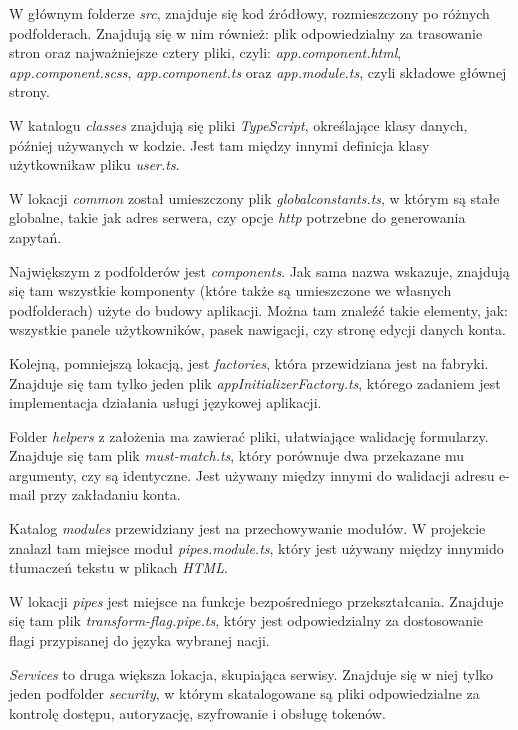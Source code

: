 \documentclass[twoside]{projektInzynierskiMS}
\numberwithin{figure}{section}
\begin{document}
W głównym folderze \textit{src}, znajduje się kod źródłowy, rozmieszczony po różnych podfolderach. Znajdują się w nim również: plik odpowiedzialny za trasowanie stron oraz najważniejsze cztery pliki, czyli:  \textit{app.component.html},  \textit{app.component.scss}, \linebreak \textit{app.component.ts} oraz \textit{app.module.ts}, czyli składowe głównej strony.

W katalogu \textit{classes} znajdują się pliki \textit{TypeScript}, określające klasy danych, później używanych w kodzie. Jest tam między innymi definicja klasy użytkownika\linebreak w pliku \textit{user.ts}.

W lokacji \textit{common} został umieszczony plik \textit{global\-constants.ts}, w którym są stałe globalne, takie jak adres serwera, czy opcje \textit{http} potrzebne do generowania zapytań.

Największym z podfolderów jest \textit{components}. Jak sama nazwa wskazuje, znajdują się tam wszystkie komponenty (które także są umieszczone we własnych podfolderach) użyte do budowy aplikacji. Można tam znaleźć takie elementy, jak: wszystkie panele użytkowników, pasek nawigacji, czy stronę edycji danych konta.

Kolejną, pomniejszą lokacją, jest \textit{factories}, która przewidziana jest na fabryki. Znajduje się tam tylko jeden plik \textit{appInitializerFactory.ts}, którego zadaniem jest implementacja działania usługi językowej aplikacji.

Folder \textit{helpers} z założenia ma zawierać pliki, ułatwiające walidację formularzy. Znajduje się tam plik \textit{must-match.ts}, który porównuje dwa przekazane mu argumenty, czy są identyczne. Jest używany między innymi do walidacji adresu e-mail przy zakładaniu konta.

Katalog \textit{modules} przewidziany jest na przechowywanie modułów. W projekcie znalazł tam miejsce moduł \textit{pipes.module.ts}, który jest używany między innymi\linebreak do tłumaczeń tekstu w plikach \textit{HTML}.

W lokacji \textit{pipes} jest miejsce na funkcje bezpośredniego przekształcania. Znajduje się tam plik \textit{transform-flag.pipe.ts}, który jest odpowiedzialny za dostosowanie flagi przypisanej do języka wybranej nacji.

\textit{Services} to druga większa lokacja, skupiająca serwisy. Znajduje się w niej tylko jeden podfolder \textit{security}, w którym skatalogowane są pliki odpowiedzialne za kontrolę dostępu, autoryzację, szyfrowanie i obsługę tokenów. 
\end{document}
